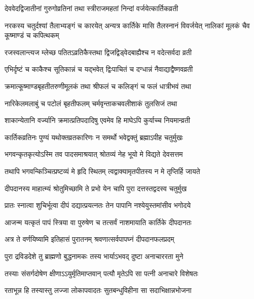 \twolineshloka
{देववेदद्विजातीनां गुरुगोव्रतिनां तथा}
{स्त्रीराजमहतां निन्दां वर्जयेत्कार्तिकव्रती} %

\threelineshloka
{नरकस्य चतुर्दश्यां तैलाभ्यङ्गं च कारयेत्}
{अन्यत्र कार्तिके मासि तैलस्नानं विवर्जयेत्}
{नालिकां मूलकं चैव कूष्माण्डं च कपित्थकम्} %

\twolineshloka
{रजस्वलान्त्यज म्लेच्छ पतितऽव्रतिकैस्तथा}
{द्विजद्विड्वेदबाह्यैश्च न वदेत्सर्वदा व्रती} %

\twolineshloka
{एभिर्दृष्टं च काकैश्च सूतिकान्नं च यद्भवेत्}
{द्विःपाचितं च दग्धान्नं नैवाद्याद्वैष्णवव्रती} %

\twolineshloka
{क्रमात्कूष्माण्डबृहतीतरुणीमूलकं तथा}
{श्रीफलं च कलिङ्गं च फलं धात्रीभवं तथा} %

\twolineshloka
{नारिकेलमलाबुं च पटोलं बृहतीफलम्}
{चर्मवृन्ताकचवलीशाकं तुलसिजं तथा} %

\twolineshloka
{शाकान्येतानि वर्ज्यानि क्रमात्प्रतिपदादिषु}
{एवमेव हि माघेऽपि कुर्याच्च नियमान्व्रती} %

\twolineshloka
{कार्तिकव्रतिनः पुण्यं यथोक्तव्रतकारिणः}
{न समर्थो भवेद्वक्तुं ब्रह्माऽपीह चतुर्मुखः} %





\twolineshloka
{भगवन्कृतकृत्योऽस्मि तव पादसमाश्रयात्}
{श्रोतव्यं नेह भूयो मे विद्यते देवसत्तम} %

\twolineshloka
{तथापि भगवन्किञ्चित्प्रष्टव्यं मे हृदि स्थितम्}
{त्वद्वाक्यामृतपीतस्य न मे तृप्तिर्हि जायते} %

\twolineshloka
{दीपदानस्य माहात्म्यं श्रोतुमिच्छामि ते प्रभो}
{येन चापि पुरा दत्तस्तद्वदस्व चतुर्मुख} %


\twolineshloka
{प्रातः स्नात्वा शुचिर्भूत्वा दीपं दद्यात्प्रयत्नतः}
{तेन पापानि नश्येयुस्तमांसीव भगोदये} %

\twolineshloka
{आजन्म यत्कृतं पापं स्त्रिया वा पुरुषेण च}
{तत्सर्वं नाशमायाति कार्तिके दीपदानतः} %

\twolineshloka
{अत्र ते वर्णयिष्यामि इतिहासं पुरातनम्}
{श्रवणात्सर्वपापघ्नं दीपदानफलप्रदम्} %

\twolineshloka
{पुरा द्रविडदेशे तु ब्राह्मणो बुद्धनामकः}
{तस्य भार्याऽभवद् दुष्टा अनाचाररता मुने} %

\twolineshloka
{तस्याः संसर्गदोषेण क्षीणाऽऽयुर्मृतिमाप्तवान्}
{पत्यौ मृतेऽपि सा पत्नी अनाचारे विशेषतः} %

\twolineshloka
{रताभून्न हि तस्यास्तु लज्जा लोकापवादतः}
{सुतबन्धुविहीना सा सदाभिक्षान्नभोजना} %

